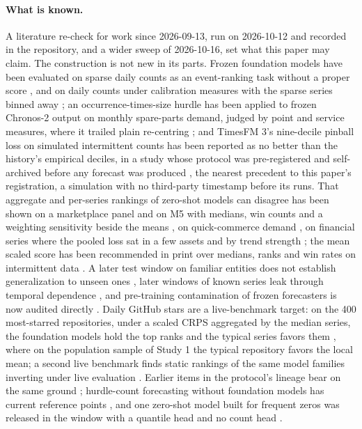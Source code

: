 \paragraph{What is known.} A literature re-check for work since 2026-09-13, run on 2026-10-12 and recorded
in the repository, and a wider sweep of 2026-10-16, set what this paper may claim. The construction is not new
in its parts. Frozen foundation models have been evaluated on sparse daily counts as an event-ranking task
without a proper score \citep{schoess2026}, and on daily counts under calibration measures with the sparse
series binned away \citep{adler2025}; an occurrence-times-size hurdle has been applied to frozen Chronos-2
output on monthly spare-parts demand, judged by point and service measures, where it trailed plain
re-centring \citep{chin2026}; and TimesFM 3's nine-decile pinball loss on simulated intermittent counts has
been reported as no better than the history's empirical deciles, in a study whose protocol was pre-registered
and self-archived before any forecast was produced \citep{ebrahim2026, ebrahim2026zenodo}, the nearest
precedent to this paper's registration, a simulation with no third-party timestamp before its runs. That
aggregate and per-series rankings of zero-shot models can disagree has been shown on a marketplace panel and
on M5 with medians, win counts and a weighting sensitivity beside the means \citep{islam2026}, on
quick-commerce demand \citep{kim2026}, on financial series where the pooled loss sat in a few assets
\citep{brini2026} and by trend strength \citep{cherif2026}; the mean scaled score has been recommended in
print over medians, ranks and win rates on intermittent data \citep{corani2026}. A later test window on
familiar entities does not establish generalization to unseen ones \citep{moghadasi2026}, later windows of
known series leak through temporal dependence \citep{qiao2026}, and pre-training contamination of frozen
forecasters is now audited directly \citep{li2026}. Daily GitHub stars are a live-benchmark target: on the
400 most-starred repositories, under a scaled CRPS aggregated by the median series, the foundation models
hold the top ranks and the typical series favors them \citep{garza2026}, where on the population sample of
Study 1 the typical repository favors the local mean; a second live benchmark finds static rankings of the
same model families inverting under live evaluation \citep{wen2026}. Earlier items in the protocol's lineage
bear on the same ground \citep{tsantilis2025, zodiac2026, fevbench2026, meyer2025}; hurdle-count forecasting
without foundation models has current reference points \citep{damato2026, bai2026}, and one zero-shot model
built for frequent zeros was released in the window with a quantile head and no count head
\citep{exaone2026}.

